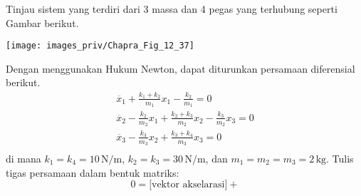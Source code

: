 \begin{soal}

Tinjau sistem yang terdiri dari 3 massa dan 4 pegas yang terhubung
seperti Gambar berikut.

{\centering
\texttt{[image: images\_priv/Chapra\_Fig\_12\_37]}
\par}

Dengan menggunakan Hukum Newton, dapat diturunkan persamaan diferensial
berikut.
\begin{align*}
\ddot{x_{1}} + \frac{k_1 + k_2}{m_1} x_{1} - \frac{k_2}{m_1} = 0 \\
\ddot{x_{2}} - \frac{k_2}{m_2}x_1 + \frac{k_2 + k_3}{m_2}x_2 - \frac{k_3}{m_2}x_3 = 0 \\
\ddot{x_{3}} - \frac{k_3}{m_3}x_2 + \frac{k_3 + k_4}{m_3}x_3 = 0\\
\end{align*}
di mana $k_1 = k_4 = 10\,\mathrm{N/m}$, $k_2 = k_3 = 30\,\mathrm{N/m}$,
dan $m_1 = m_2 = m_3 = 2\,\mathrm{kg}$. Tulis tigas persamaan dalam bentuk matriks:
\begin{equation*}
0 = \text{[vektor akselarasi]} + 
\end{equation*}

\end{soal}